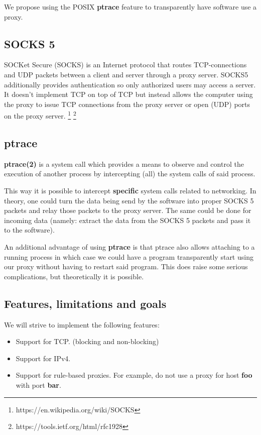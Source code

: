 \documentclass[a4paper]{article}
\begin{document}
We propose using the POSIX \textbf{ptrace} feature to transparently have
software use a proxy.

\subsection{SOCKS 5}

SOCKet Secure (SOCKS) is an Internet protocol that routes TCP-connections and
UDP packets between a client and server through a proxy server. SOCKS5
additionally provides authentication so only authorized users may access a
server. It doesn't implement TCP on top of TCP but instead allows the computer using
the proxy to issue TCP connections from the proxy server or open (UDP) ports on the
proxy server.
\footnote{https://en.wikipedia.org/wiki/SOCKS}
\footnote{https://tools.ietf.org/html/rfc1928}

\subsection{ptrace}

\textbf{ptrace(2)} is a system call which provides a means to observe and
control the execution of another process by intercepting (all) the system calls
of said process.

This way it is possible to intercept \textbf{specific} system calls related to
networking. In theory, one could turn the data being send by the software into
proper SOCKS 5 packets and relay those packets to the proxy server. The same
could be done for incoming data (namely: extract the data from the SOCKS 5
packets and pass it to the software).

An additional advantage of using \textbf{ptrace} is that ptrace also allows
attaching to a running process in which case we could have a program
transparently start using our proxy without having to restart said program. This
does raise some serious complications, but theoretically it is possible.

\subsection{Features, limitations and goals}

We will strive to implement the following features:

\begin{itemize}
\item Support for TCP. (blocking and non-blocking)
\item Support for IPv4.
\item Support for rule-based proxies. For example, do not use a proxy for
host \textbf{foo} with port \textbf{bar}.
\end{itemize}
\end{document}
